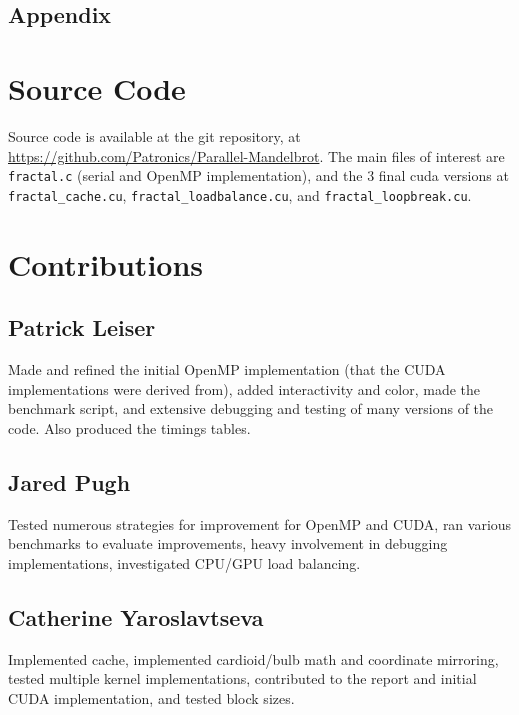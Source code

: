 \documentclass{article}
\begin{document}
\pagebreak

\begin{center}

\section*{Appendix}

\end{center}

\appendix

\section{Source Code}

Source code is available at the git repository, at \url{https://github.com/Patronics/Parallel-Mandelbrot}. The main files of interest are \verb|fractal.c| (serial and OpenMP implementation), and the 3 final cuda versions at \verb|fractal_cache.cu|, \verb|fractal_loadbalance.cu|, and \verb|fractal_loopbreak.cu|.

\section{Contributions}

\subsection{Patrick Leiser}
Made and refined the initial OpenMP implementation (that the CUDA implementations were derived from), added interactivity and color, made the benchmark script, and extensive debugging and testing of many versions of the code. Also produced the timings tables. 

\subsection{Jared Pugh}
Tested numerous strategies for improvement for OpenMP and CUDA, ran various benchmarks to evaluate improvements, heavy involvement in debugging implementations, investigated CPU/GPU load balancing.

\subsection{Catherine Yaroslavtseva}
Implemented cache, implemented cardioid/bulb math and coordinate mirroring, tested multiple kernel implementations, contributed to the report and initial CUDA implementation, and tested block sizes.
\end{document}
